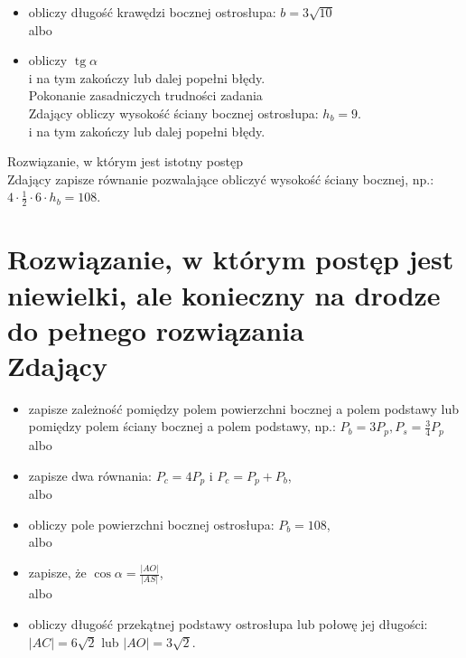 \documentclass[10pt]{article}
\begin{document}
\begin{itemize}
  \item obliczy długość krawędzi bocznej ostrosłupa: $b=3 \sqrt{10}$\\
albo
  \item obliczy $\operatorname{tg} \alpha$\\
i na tym zakończy lub dalej popełni błędy.\\
Pokonanie zasadniczych trudności zadania\\
Zdający obliczy wysokość ściany bocznej ostrosłupa: $h_{b}=9$.\\
i na tym zakończy lub dalej popełni błędy.
\end{itemize}

Rozwiązanie, w którym jest istotny postęp\\
Zdający zapisze równanie pozwalające obliczyć wysokość ściany bocznej, np.:\\
$4 \cdot \frac{1}{2} \cdot 6 \cdot h_{b}=108$.

\section*{Rozwiązanie, w którym postęp jest niewielki, ale konieczny na drodze do pełnego rozwiązania \\
 Zdający}
\begin{itemize}
  \item zapisze zależność pomiędzy polem powierzchni bocznej a polem podstawy lub pomiędzy polem ściany bocznej a polem podstawy, np.: $P_{b}=3 P_{p}, P_{s}=\frac{3}{4} P_{p}$\\
albo
  \item zapisze dwa równania: $P_{c}=4 P_{p}$ i $P_{c}=P_{p}+P_{b}$,\\
albo
  \item obliczy pole powierzchni bocznej ostrosłupa: $P_{b}=108$,\\
albo
  \item zapisze, że $\cos \alpha=\frac{|A O|}{|A S|}$,\\
albo
  \item obliczy długość przekątnej podstawy ostrosłupa lub połowę jej długości: $|A C|=6 \sqrt{2}$ lub $|A O|=3 \sqrt{2}$.
\end{itemize}
\end{document}
